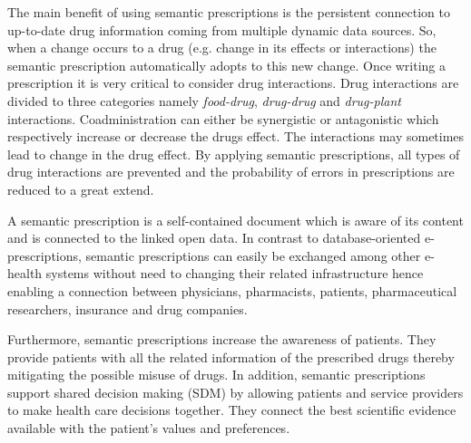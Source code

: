 \documentclass[conference]{IEEEtran}
\begin{document}
The main benefit of using semantic prescriptions is the persistent connection to up-to-date drug information coming from multiple dynamic data sources.
So, when a change occurs to a drug (e.g. change in its effects or interactions) the semantic prescription automatically adopts to this new change.
Once writing a prescription it is very critical to consider drug interactions.
Drug interactions are divided to three categories namely \emph{food-drug}, \emph{drug-drug} and \emph{drug-plant} interactions.
Coadministration can either be synergistic or antagonistic which respectively increase or decrease the drugs effect.
The interactions may sometimes lead to change in the drug effect.
By applying semantic prescriptions, all types of drug interactions are prevented and the probability of errors in prescriptions are reduced to a great extend.

A semantic prescription is a self-contained document which is aware of its content and is connected to the linked open data.
In contrast to database-oriented e-prescriptions, semantic prescriptions can easily be exchanged among other e-health systems without need to changing their related infrastructure hence enabling a connection between physicians, pharmacists, patients, pharmaceutical researchers, insurance and drug companies.

Furthermore, semantic prescriptions increase the awareness of patients.
They provide patients with all the related information of the prescribed drugs thereby mitigating the possible misuse of drugs.
In addition, semantic prescriptions support shared decision making (SDM) by allowing patients and service providers to make health care decisions together.
They connect the best scientific evidence available with the patient’s values and preferences.

\end{document}
